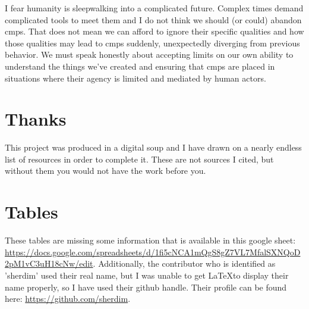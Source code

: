 \documentclass[a4paper,man,natbib,floatsintext]{apa6}
\begin{document}
  I fear humanity is sleepwalking into a complicated future. Complex times demand complicated tools to meet them and I do not think we should (or could) abandon \glspl{cmp}. That does not mean we can afford to ignore their specific qualities and how those qualities may lead to \glspl{cmp} suddenly, unexpectedly diverging from previous behavior. We must speak honestly about accepting limits on our own ability to understand the things we've created and ensuring that \glspl{cmp} are placed in situations where their agency is limited and mediated by human actors. 
  

   \singlespacing
   \printnoidxglossaries

  \section{Thanks}
  This project was produced in a digital soup and I have drawn on a nearly endless list of resources in order to complete it. These are not sources I cited, but without them you would not have the work before you.

  

   \section{Tables}
   These tables are missing some information that is available in this google sheet: \url{https://docs.google.com/spreadsheets/d/1fi5cNCA1mQgS8gZ7VL7MfalSXNQoD2pM1vC3uH18cNw/edit}. Additionally, the contributor who is identified as 'sherdim' used their real name, but I was unable to get \LaTeX to display their name properly, so I have used their github handle. Their profile can be found here: \url{https://github.com/sherdim}.
\end{document}
